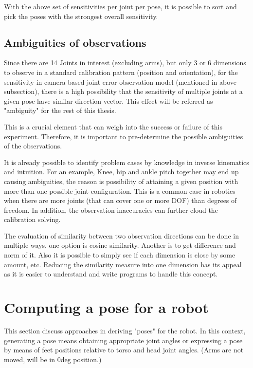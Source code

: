 \documentclass[english, printversion, nomenclature, notitle]{tuvisionthesis} %
\begin{document}
With the above set of sensitivities per joint per pose, it is possible to sort and pick the poses with the strongest overall sensitivity.

\subsection{Ambiguities of observations}
\label{subsec:ambiguities}

Since there are 14 Joints in interest (excluding arms), but only 3 or 6 dimensions to observe in a standard calibration pattern (position and orientation), for the sensitivity in camera based joint error observation model (mentioned in above subsection), there is a high possibility that the sensitivity of multiple joints at a given pose have similar direction vector. This effect will be referred as "ambiguity" for the rest of this thesis.
 
This is a crucial element that can weigh into the success or failure of this experiment. Therefore, it is important to pre-determine the possible ambiguities of the observations. 

It is already possible to identify problem cases by knowledge in inverse kinematics and intuition. For an example, Knee, hip and ankle pitch together may end up causing ambiguities, the reason is possibility of attaining a given position with more than one possible joint configuration. This is a common case in robotics when there are more joints (that can cover one or more DOF) than degrees of freedom. In addition, the observation inaccuracies can further cloud the calibration solving.

The evaluation of similarity between two observation directions can be done in multiple ways, one option is cosine similarity. Another is to get difference and norm of it. Also it is possible to simply see if each dimension is close by some amount, etc. Reducing the similarity measure into one dimension has its appeal as it is easier to understand and write programs to handle this concept.


\section{Computing a pose for a robot}
This section discuss approaches in deriving "poses" for the robot. In this context, generating a pose means obtaining appropriate joint angles or expressing a pose by means of feet positions relative to torso and head joint angles. (Arms are not moved, will be in 0deg position.)
\end{document}
